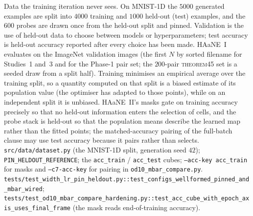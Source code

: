 {Data the training iteration never sees. On MNIST-1D the $5000$ generated examples are split into $4000$ training and $1000$ held-out (test) examples, and the $600$ probes are drawn once from the held-out split and pinned. Validation is the use of held-out data to choose between models or hyperparameters; test accuracy is held-out accuracy reported after every choice has been made. HAaNE~I evaluates on the ImageNet validation images (the first $N$ by sorted filename for Studies~1 and~3 and for the Phase-1 pair set; the $200$-pair \textsc{theorem45} set is a seeded draw from a split half).}
{Training minimises an empirical average over the training split, so a quantity computed on that split is a biased estimate of its population value (the optimiser has adapted to those points), while on an independent split it is unbiased. HAaNE~II's masks gate on training accuracy precisely so that no held-out information enters the selection of cells, and the probe stack is held-out so that the population means describe the learned map rather than the fitted points; the matched-accuracy pairing of the full-batch clause may use test accuracy because it pairs rather than selects.}
{\texttt{src/data/dataset.py} (the MNIST-1D split, generation seed $42$); \texttt{PIN\_HELDOUT\_REFERENCE}; the \texttt{acc\_train} / \texttt{acc\_test} cubes; \texttt{--acc-key acc\_train} for masks and \texttt{--c7-acc-key} for pairing in \texttt{od10\_mbar\_compare.py}.}
{\texttt{tests/test\_width\_lr\_pin\_heldout.py::test\_configs\_wellformed\_pinned\_and\_mbar\_wired}; \texttt{tests/test\_od10\_mbar\_compare\_hardening.py::test\_acc\_cube\_with\_epoch\_axis\_uses\_final\_frame} (the mask reads end-of-training accuracy).}
